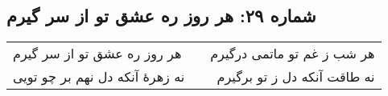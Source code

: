 \begin{center}
\section*{شماره ۲۹: هر روز ره عشق تو از سر گیرم}
\label{sec:029}
\begin{longtable}{l p{0.5cm} r}
هر روز ره عشق تو از سر گیرم
&&
هر شب ز غم تو ماتمی درگیرم
\\
نه زهرهٔ آنکه دل نهم بر چو تویی
&&
نه طاقت آنکه دل ز تو برگیرم
\\
\end{longtable}
\end{center}
